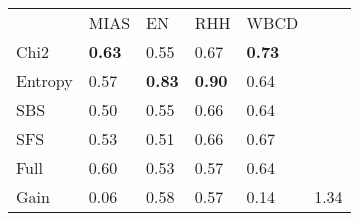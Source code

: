 \begin{tabular}{|l|l|l|l|l|l}
\cline{1-5}
        & MIAS              & EN                & RHH               & WBCD      &         \\
\cline{1-5}
Chi2    & \textbf{0.63}  & 0.55           & 0.67           & \textbf{0.73}  &         \\
Entropy & 0.57           & \textbf{0.83}  & \textbf{0.90}  & 0.64           &         \\
SBS     & 0.50           & 0.55           & 0.66           & 0.64           &         \\
SFS     & 0.53           & 0.51           & 0.66           & 0.67           &         \\
Full    & 0.60           & 0.53           & 0.57           & 0.64 \\
\cline{1-5}
\cline{1-5}
Gain    & 0.06           & 0.58           & 0.57           & 0.14           & 1.34 \\
\cline{1-5}
\end{tabular}
